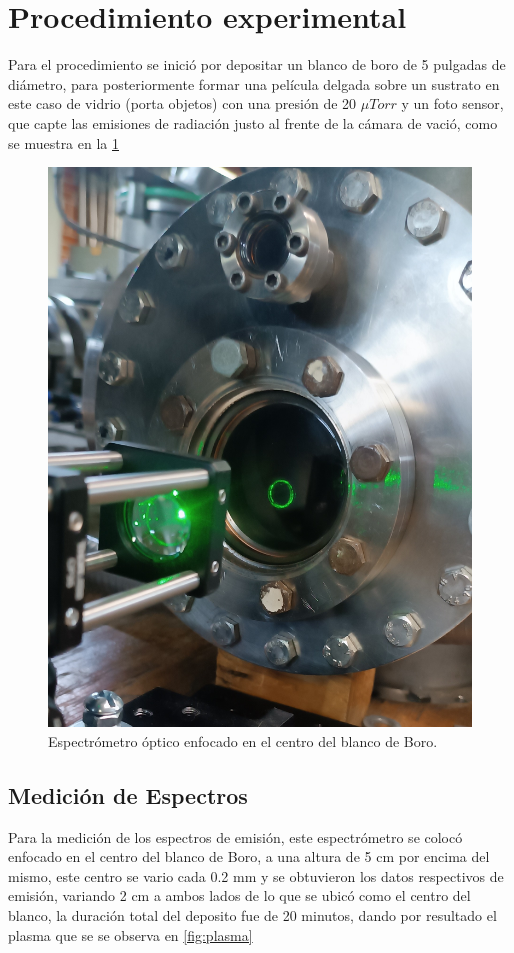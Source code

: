 \documentclass[12pt]{IEEEtran}
\begin{document}
\section{Procedimiento experimental}

Para el procedimiento se inició por depositar un blanco de boro de 5 pulgadas de diámetro, para posteriormente formar una película delgada sobre un sustrato en este caso de vidrio (porta objetos) con una presión de 20 $\mu Torr$ y un foto sensor, que capte las emisiones de radiación justo al frente de la cámara de vació, como se muestra en la \ref{fig:Espectometro}   


\begin{figure}[htp]
	\centering
	\includegraphics[width=0.6\linewidth]{figs/buenaaaaaaaaa.jpg}
	\caption{Espectrómetro óptico enfocado en el centro del blanco de Boro.}
	\label{fig:Espectometro}
\end{figure}

\subsection{Medición de Espectros}

Para la medición de los espectros de emisión, este espectrómetro se colocó enfocado en el centro del blanco de Boro, a una altura de 5 cm por encima del mismo, este centro se vario cada 0.2 mm y se obtuvieron los datos respectivos de emisión, variando 2 cm a ambos lados de lo que se ubicó como el centro del blanco, la duración total del deposito fue de 20 minutos, dando por resultado el plasma que se se observa en \ref{fig:plasma}
\end{document}

